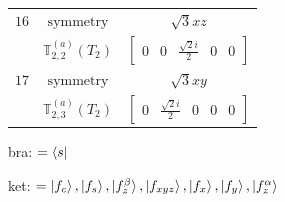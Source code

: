 \documentclass[fleqn,8pt,landscape]{jsarticle}
\begin{document}
\begin{longtable}{ccc}
$ 16 $ & $ \text{symmetry} $ & $ \sqrt{3} x z $ \\
$  $ & $ \mathbb{T}_{2,2}^{(a)}(T_{2}) $ & $ \begin{bmatrix} 0 & 0 & \frac{\sqrt{2} i}{2} & 0 & 0 \end{bmatrix} $ \\ \hline
$ 17 $ & $ \text{symmetry} $ & $ \sqrt{3} x y $ \\
$  $ & $ \mathbb{T}_{2,3}^{(a)}(T_{2}) $ & $ \begin{bmatrix} 0 & \frac{\sqrt{2} i}{2} & 0 & 0 & 0 \end{bmatrix} $ \\ \hline
\end{longtable}
bra: $=\bra{s}$

\noindent
ket: $=\ket{f_{c}}, \ket{f_{s}}, \ket{f_{z}^{\beta}}, \ket{f_{xyz}}, \ket{f_{x}}, \ket{f_{y}}, \ket{f_{z}^{\alpha}}$
\renewcommand{\arraystretch}{1.6}
\end{document}
